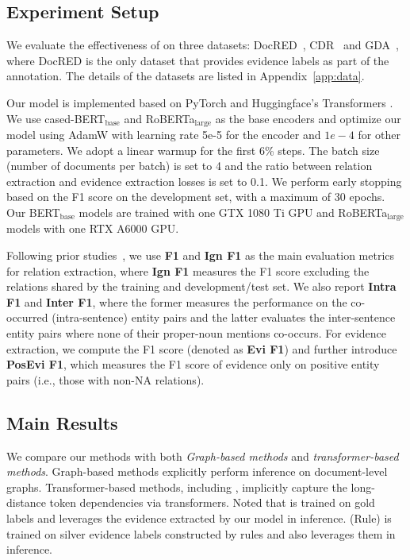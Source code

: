 \subsection{Experiment Setup}
\label{sec:setup}
We evaluate the effectiveness of \ours on three datasets: DocRED~\cite{DocRED-paper}, CDR~\cite{CDR} and GDA~\cite{GDA}, where DocRED is the only dataset that provides evidence labels as part of the annotation. The details of the datasets are listed in Appendix~\ref{app:data}.

\smallskip
{}
Our model is implemented based on PyTorch and Huggingface's Transformers \cite{wolf2019huggingface}. We use cased-BERT$_{\text{base}}$ \cite{BERT} and RoBERTa$_{\text{large}}$ as the base encoders and optimize our model using AdamW with learning rate 5e-5 for the encoder and $1e-4$ for other parameters. We adopt a linear warmup for the first 6\% steps. The batch size (number of documents per batch) is set to 4 and the ratio between relation extraction and evidence extraction losses is set to 0.1. We perform early stopping based on the F1 score on the development set, with a maximum of 30 epochs. Our BERT$_{\text{base}}$ models are trained with one GTX 1080 Ti GPU and RoBERTa$_{\text{large}}$ models with one RTX A6000 GPU.

\smallskip
{}
Following prior studies~\cite{DocRED-paper}, we use \textbf{F1} and \textbf{Ign F1} as the main evaluation metrics for relation extraction, where \textbf{Ign F1} measures the F1 score excluding the relations shared by the training and development/test set.
We also report \textbf{Intra F1} and \textbf{Inter F1}, where the former measures the performance on the co-occurred (intra-sentence) entity pairs and the latter evaluates the inter-sentence entity pairs where none of their proper-noun mentions co-occurs.
For evidence extraction, we compute the F1 score (denoted as \textbf{Evi F1}) and further introduce \textbf{PosEvi F1}, which measures the F1 score of evidence only on positive entity pairs (i.e., those with non-NA relations).

\subsection{Main Results}
We compare our methods with both \emph{Graph-based methods} and \emph{transformer-based methods}. Graph-based methods explicitly perform inference on document-level graphs. Transformer-based methods, including \ours, implicitly capture the long-distance token dependencies via transformers.
Noted that \ours is trained on gold labels and leverages the evidence extracted by our model in inference. \ours (Rule) is trained on silver evidence labels constructed by rules and also leverages them in inference. 

